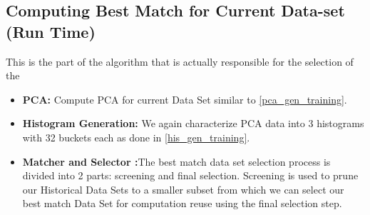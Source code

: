 \subsection{Computing Best Match for Current Data-set (Run Time)}
This is the part of the algorithm that is actually responsible for the selection of the 
\begin{itemize}
	\item \textbf{PCA:}  Compute PCA for current Data Set similar to \ref{pca_gen_training}.
	\item \textbf{Histogram Generation:} We again characterize PCA data into 3 histograms with 32 buckets each as done in \ref{his_gen_training}.
	\item \textbf{Matcher and Selector :}The best match data set selection process is divided into 2 parts: screening and final selection. Screening is used to prune our Historical Data Sets to a smaller subset from which we can select our best match Data Set for computation reuse using the final selection step.
	

\end{itemize}

